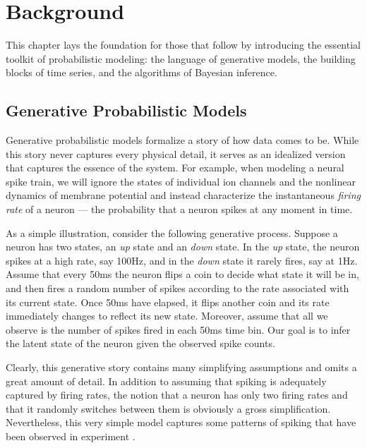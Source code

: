 
\chapter{Background}
This chapter lays the foundation for those that follow by introducing 
the essential toolkit of probabilistic modeling: the language of 
generative models, the building blocks of time series, and the algorithms
of Bayesian inference. 


\section{Generative Probabilistic Models}
\label{sec:generative_models}
Generative probabilistic models formalize a story of how data comes to be. 
While this story never captures every physical detail, it serves as an 
idealized version that captures the essence of the system. For example, when
modeling a neural spike train, we will ignore the states of individual ion 
channels and the nonlinear dynamics of membrane potential and instead 
characterize the instantaneous \emph{firing rate} of a neuron --- the 
probability that a neuron spikes at any moment in time. 

As a simple illustration, consider the following generative
process. Suppose a neuron has two states, an \emph{up} state and an
\emph{down} state. In the \emph{up} state, the neuron spikes at a high
rate, say 100Hz, and in the \emph{down} state it rarely fires, say at 1Hz.
Assume that every 50ms the neuron flips a coin to decide what state it
will be in, and then fires a random number of spikes according to the
rate associated with its current state. Once 50ms have elapsed, it
flips another coin and its rate immediately changes to reflect its new
state. Moreover, assume that all we observe is the number of spikes
fired in each 50ms time bin.  Our goal is to infer the latent state of
the neuron given the observed spike counts.

Clearly, this generative story contains many simplifying assumptions
and omits a great amount of detail. In addition to assuming that
spiking is adequately captured by firing rates, the notion that a
neuron has only two firing rates and that it randomly switches between
them is obviously a gross simplification. Nevertheless, this very
simple model captures some patterns of spiking that have been observed
in experiment \cite{cowan1994spontaneous, shu2003turning}. 

